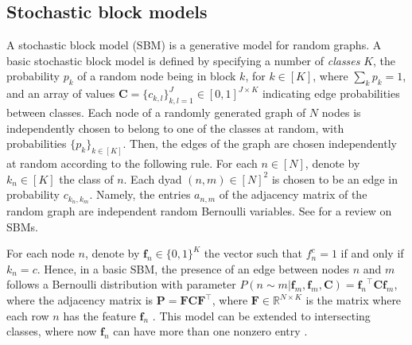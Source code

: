 \documentclass[letterpaper]{article} %
\newcommand{\ron}[1]{{{\textcolor{red}{\textbf{[Ron:} {#1}\textbf{]}}}}}
\begin{document}


\subsection{Stochastic block models} 
\label{Stochastic block models} 

A stochastic block model (SBM) is a generative model for random graphs. 
A basic stochastic block model is defined by specifying a number of \emph{classes} $K$, the probability $p_k$ of a random node being in block $k$, for $k\in[K]$, where $\sum_kp_k=1$, and an array of values $\mathbf{C}=\{c_{k,l}\}_{k,l=1}^J\in [0,1]^{J\times K}$ indicating edge probabilities between classes. Each node  of a randomly generated graph of $N$ nodes is independently chosen to belong to one of the classes at random, with probabilities  $\{p_k\}_{k\in[K]}$.  Then, the edges of the graph are chosen independently at random according to the following rule. For each $n\in[N]$, denote by $k_n\in[K]$ the class of $n$. Each dyad $(n,m)\in[N]^2$ is chosen to be an edge in probability $c_{k_n,k_m}$. Namely, the entries $a_{n,m}$ of the adjacency matrix of the random graph are independent random Bernoulli variables. See \cite{lee2019review} for a review on SBMs.

For each node $n$, denote by $\mathbf{f}_n\in\{0,1\}^K$ the vector such that $f_n^c=1$ if and only if $k_n=c$. Hence, in a basic SBM, the presence of an edge between nodes $n$ and $m$ follows a Bernoulli distribution with parameter $P(n\sim m|\mathbf{f}_m,\mathbf{f}_m,\mathbf{C}) = {\mathbf{f}_n}^\top  \mathbf{C} \mathbf{f}_m$, where the adjacency matrix is $\mathbf{P} = \mathbf{F}  \mathbf{C} \mathbf{F}^\top$, where $\mathbf{F}\in\mathbb{R}^{N\times K}$ is the matrix where each row $n$ has the feature $\mathbf{f}_n$ \cite{nowicki2001estimation}. 
This model can be extended to intersecting classes, where now $\mathbf{f}_n$ can have more than one nonzero entry \cite{morup2011infinite,miller2009overlappingsbm1,palla2012overlappingsbm2}.
\end{document}
